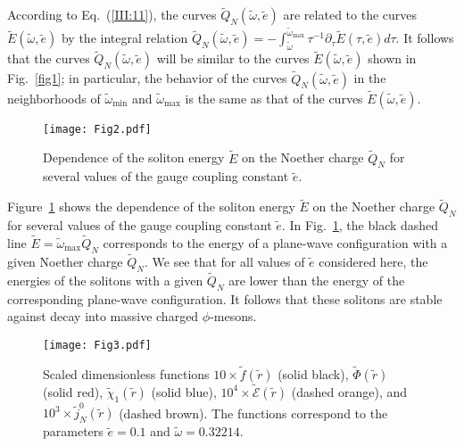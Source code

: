 According  to  Eq.~(\ref{III:11}),  the  curves  $\tilde{Q}_{N}(\tilde{\omega},
\tilde{e})$ are related to the curves $\tilde{E}(\tilde{\omega}, \tilde{e})$ by
the  integral  relation  $\tilde{Q}_{N}\left( \tilde{\omega }, \tilde{e}\right)
=-\int\nolimits_{\tilde{\omega}}^{\tilde{\omega}_{\max}}\tau^{-1}\partial_{\tau
}\tilde{E}\left( \tau ,\tilde{e}\right) d\tau$.
It follows  that   the  curves  $\tilde{Q}_{N}(\tilde{\omega}, \tilde{e})$ will
be similar to  the  curves   $\tilde{E}(\tilde{\omega},  \tilde{e})$  shown  in
Fig.~\ref{fig1}; in  particular, the  behavior  of  the  curves $\tilde{Q}_{N}(
\tilde{\omega},\tilde{e})$ in the neighborhoods of $\tilde{\omega}_{\min}$  and
$\tilde{\omega}_{\max}$ is the same as  that  of  the curves $\tilde{E}(\tilde{
\omega}, \tilde{e})$.

\begin{figure}[tbp]
\texttt{[image: Fig2.pdf]}
\caption{\label{fig2}     Dependence  of  the  soliton  energy  $\tilde{E}$  on
the Noether  charge  $\tilde{Q}_{N}$  for  several values of the gauge coupling
constant $\tilde{e}$.}
\end{figure}

Figure~\ref{fig2} shows the  dependence  of  the  soliton energy $\tilde{E}$ on
the Noether  charge  $\tilde{Q}_{N}$  for  several values of the gauge coupling
constant $\tilde{e}$.
In Fig.~\ref{fig2}, the  black  dashed  line $\tilde{E} = \tilde{\omega}_{\max}
\tilde{Q}_{N}$ corresponds to the energy  of  a  plane-wave  configuration with
a given Noether charge $\tilde{Q}_{N}$.
We see that for all values of $\tilde{e}$ considered here,  the energies of the
solitons with  a  given  $\tilde{Q}_{N}$  are  lower  than  the  energy  of the
corresponding plane-wave configuration.
It follows that these solitons are stable  against  decay  into massive charged
$\phi$-mesons.

\begin{figure}[tbp]
\texttt{[image: Fig3.pdf]}
\caption{\label{fig3}    Scaled  dimensionless  functions  $10 \times \tilde{f}
(\tilde{r})$ (solid black), $\tilde{\Phi}(\tilde{r})$ (solid red), $\tilde{\chi
}_{1}(\tilde{r})$  (solid blue), $10^{4} \times \tilde{\mathcal{E}}(\tilde{r})$
(dashed orange), and $10^{3}\times\tilde{j}_{N}^{0}(\tilde{r})$ (dashed brown).
The functions correspond to the parameters $\tilde{e}=0.1$ and  $\tilde{\omega}
= 0.32214$.}
\end{figure}

